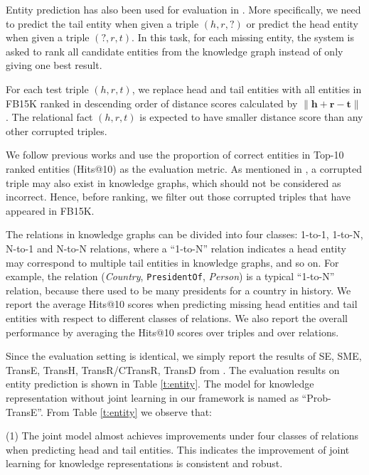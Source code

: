 \documentclass[11pt,a4paper]{article}
\begin{document}
Entity prediction has also been used for evaluation in \cite{bordes2013translating,wang2014transh,lin2015learning,ji2015knowledge,he2015learning,xiao2015transg,ji2016knowledge}. More specifically, we need to predict the tail entity when given a triple $(h, r, ?)$ or predict the head entity when given a triple $(?, r ,t)$. In this task, for each missing entity, the system is asked to rank all candidate entities from the knowledge graph instead of only giving one best result. 

For each test triple $(h, r, t)$, we replace head and tail entities with all entities in FB15K ranked in descending order of distance scores calculated by $\lVert \textbf{h} + \textbf{r} - \textbf{t} \rVert$. The relational fact $(h, r, t)$ is expected to have smaller distance score than any other corrupted triples.

We follow previous works and use the proportion of correct entities in Top-10 ranked entities (Hits@10) as the evaluation metric. As mentioned in \cite{bordes2013translating}, a corrupted triple may also exist in knowledge graphs, which should not be considered as incorrect. Hence, before ranking, we filter out those corrupted triples that have appeared in FB15K.

The relations in knowledge graphs can be divided into four classes: 1-to-1, 1-to-N, N-to-1 and N-to-N relations, where a ``1-to-N'' relation indicates a head entity may correspond to multiple tail entities in knowledge graphs, and so on. For example, the relation (\emph{Country}, \texttt{PresidentOf}, \emph{Person}) is a typical ``1-to-N'' relation, because there used to be many presidents for a country in history. We report the average Hits@10 scores when predicting missing head entities and tail entities with respect to different classes of relations. We also report the overall performance by averaging the Hits@10 scores over triples and over relations.

Since the evaluation setting is identical, we simply report the results of SE, SME, TransE, TransH, TransR/CTransR, TransD from \cite{bordes2011learning,bordes2012joint,bordes2013translating,wang2014transh,lin2015learning,ji2015knowledge}. The evaluation results on entity prediction is shown in Table \ref{t:entity}. The model for knowledge representation without joint learning in our framework is named as ``Prob-TransE''. From Table \ref{t:entity} we observe that:

(1) The joint model almost achieves improvements under four classes of relations when predicting head and tail entities. This indicates the improvement of joint learning for knowledge representations is consistent and robust. 
\end{document}
